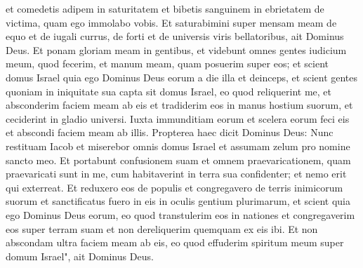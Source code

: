 \begin{biblechapter}
\verse et comedetis adipem in saturitatem et bibetis sanguinem in ebrietatem de victima, quam ego immolabo vobis. 
\verse Et saturabimini super mensam meam de equo et de iugali currus, de forti et de universis viris bellatoribus, ait Dominus Deus. 
\verse Et ponam gloriam meam in gentibus, et videbunt omnes gentes iudicium meum, quod fecerim, et manum meam, quam posuerim super eos; 
\verse et scient domus Israel quia ego Dominus Deus eorum a die illa et deinceps, 
\verse et scient gentes quoniam in iniquitate sua capta sit domus Israel, eo quod reliquerint me, et absconderim faciem meam ab eis et tradiderim eos in manus hostium suorum, et ceciderint in gladio universi. 
\verse Iuxta immunditiam eorum et scelera eorum feci eis et abscondi faciem meam ab illis. 
\verse Propterea haec dicit Dominus Deus: Nunc restituam Iacob et miserebor omnis domus Israel et assumam zelum pro nomine sancto meo. 
\verse Et portabunt confusionem suam et omnem praevaricationem, quam praevaricati sunt in me, cum habitaverint in terra sua confidenter; et nemo erit qui exterreat. 
\verse Et reduxero eos de populis et congregavero de terris inimicorum suorum et sanctificatus fuero in eis in oculis gentium plurimarum, 
\verse et scient quia ego Dominus Deus eorum, eo quod transtulerim eos in nationes et congregaverim eos super terram suam et non dereliquerim quemquam ex eis ibi. 
\verse Et non abscondam ultra faciem meam ab eis, eo quod effuderim spiritum meum super domum Israel", ait Dominus Deus. 
\end{biblechapter}

